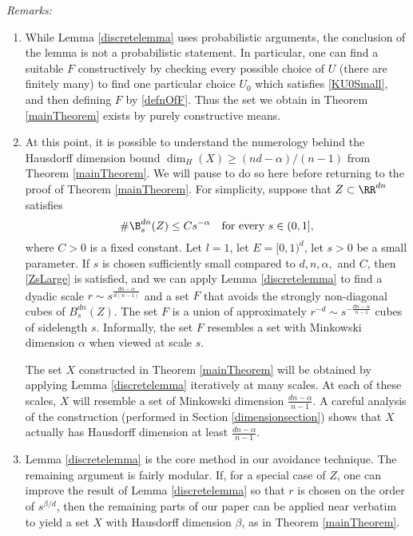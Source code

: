 {\em{Remarks: }} 
\begin{enumerate}[1.]
\item	While Lemma \ref{discretelemma} uses probabilistic arguments, the conclusion of the lemma is not a probabilistic statement. In particular, one can find a suitable $F$ constructively by checking every possible choice of $U$ (there are finitely many) to find one particular choice $U_0$ which satisfies \eqref{KU0Small}, and then defining $F$ by \eqref{defnOfF}. Thus the set we obtain in Theorem \ref{mainTheorem} exists by purely constructive means.

\item At this point, it is possible to understand the numerology behind the Hausdorff dimension bound $\dim_H(X) \geq (nd-\alpha)/(n-1)$ from Theorem \ref{mainTheorem}. We will pause to do so here before returning to the proof of Theorem \ref{mainTheorem}. For simplicity, suppose that $Z\subset\RR^{dn}$ satisfies 
\begin{equation}\label{specialCase}
\#\B_{s}^{dn}(Z)\leq Cs^{-\alpha}\quad  \textrm{for every}\ s\in(0,1],
\end{equation}
where $C>0$ is a fixed constant. Let $l=1$, let $E=[0,1)^d$, let $s>0$ be a small parameter. If $s$ is chosen sufficiently small compared to $d,n,\alpha,$ and $C$, then \eqref{ZsLarge} is satisfied, and we can apply Lemma \ref{discretelemma} to find a dyadic scale $r\sim s^{\frac{dn-\alpha}{d(n-1)}}$ and a set $F$ that avoids the strongly non-diagonal cubes of $B_{s}^{dn}(Z)$. The set $F$ is a union of approximately $r^{-d}\sim s^{-\frac{dn-\alpha}{n-1}}$ cubes of sidelength $s$. Informally, the set $F$ resembles a set with Minkowski dimension $\alpha$ when viewed at scale $s$. 

The set $X$ constructed in Theorem \ref{mainTheorem} will be obtained by applying Lemma \ref{discretelemma} iteratively at many scales. At each of these scales, $X$ will resemble a set of Minkowski dimension $\frac{dn-\alpha}{n-1}$. A careful analysis of the construction (performed in Section \ref{dimensionsection}) shows that $X$ actually has Hausdorff dimension at least $\frac{dn-\alpha}{n-1}$.




\item	Lemma \ref{discretelemma} is the core method in our avoidance technique. The remaining argument is fairly modular. If, for a special case of $Z$, one can improve the result of Lemma \ref{discretelemma} so that $r$ is chosen on the order of $s^{\beta/d}$, then the remaining parts of our paper can be applied near verbatim to yield a set $X$ with Hausdorff dimension $\beta$, as in Theorem \ref{mainTheorem}. 

\end{enumerate} 









